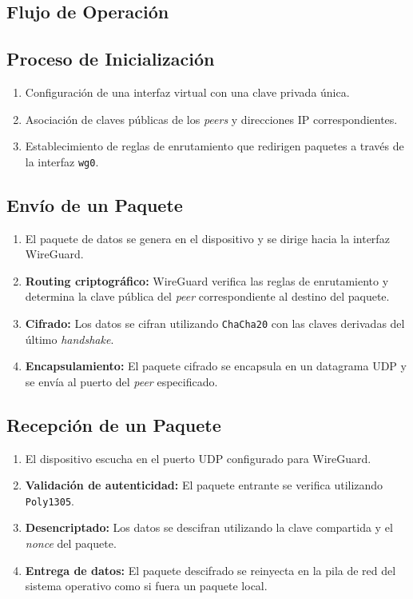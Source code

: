 \begin{enumerate}
\begin{enumerate}
   \section*{Flujo de Operación}
   
   \subsection*{Proceso de Inicialización}
   \begin{enumerate}
       \item Configuración de una interfaz virtual con una clave privada única.
       \item Asociación de claves públicas de los \textit{peers} y direcciones IP correspondientes.
       \item Establecimiento de reglas de enrutamiento que redirigen paquetes a través de la interfaz \texttt{wg0}.
   \end{enumerate}
   
   \subsection*{Envío de un Paquete}
   \begin{enumerate}
       \item El paquete de datos se genera en el dispositivo y se dirige hacia la interfaz WireGuard.
       \item \textbf{Routing criptográfico:} WireGuard verifica las reglas de enrutamiento y determina la clave pública del \textit{peer} correspondiente al destino del paquete.
       \item \textbf{Cifrado:} Los datos se cifran utilizando \texttt{ChaCha20} con las claves derivadas del último \textit{handshake}.
       \item \textbf{Encapsulamiento:} El paquete cifrado se encapsula en un datagrama UDP y se envía al puerto del \textit{peer} especificado.
   \end{enumerate}
   
   \subsection*{Recepción de un Paquete}
   \begin{enumerate}
       \item El dispositivo escucha en el puerto UDP configurado para WireGuard.
       \item \textbf{Validación de autenticidad:} El paquete entrante se verifica utilizando \texttt{Poly1305}.
       \item \textbf{Desencriptado:} Los datos se descifran utilizando la clave compartida y el \textit{nonce} del paquete.
       \item \textbf{Entrega de datos:} El paquete descifrado se reinyecta en la pila de red del sistema operativo como si fuera un paquete local.
   \end{enumerate}
   

\end{enumerate}
\end{enumerate}
